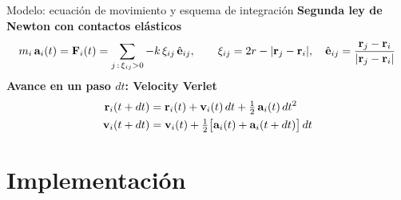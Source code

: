 \documentclass[aspectratio=169]{beamer}
\begin{document}
\begin{frame}{Modelo: ecuación de movimiento y esquema de integración}
  \setlength{\abovedisplayskip}{3pt}\setlength{\belowdisplayskip}{3pt}
  \textbf{Segunda ley de Newton con contactos elásticos}
  \[
    m_i\,\mathbf{a}_i(t) = \mathbf{F}_i(t) = \sum_{j\,:\,\xi_{ij} > 0} -k\,\xi_{ij}\,\hat{\mathbf{e}}_{ij},
    \qquad
    \xi_{ij} = 2r - |\mathbf{r}_j - \mathbf{r}_i|, \quad
    \hat{\mathbf{e}}_{ij} = \frac{\mathbf{r}_j - \mathbf{r}_i}{|\mathbf{r}_j - \mathbf{r}_i|}
  \]
  \vspace{0.3em}
  \textbf{Avance en un paso $dt$: Velocity Verlet}
  \begin{align*}
    \mathbf{r}_i(t + dt) &= \mathbf{r}_i(t) + \mathbf{v}_i(t)\,dt + \tfrac{1}{2}\,\mathbf{a}_i(t)\,dt^2\\
    \mathbf{v}_i(t + dt) &= \mathbf{v}_i(t) + \tfrac{1}{2}\bigl[\mathbf{a}_i(t) + \mathbf{a}_i(t + dt)\bigr]\,dt
  \end{align*}
\end{frame}

\section{Implementación}
\end{document}
